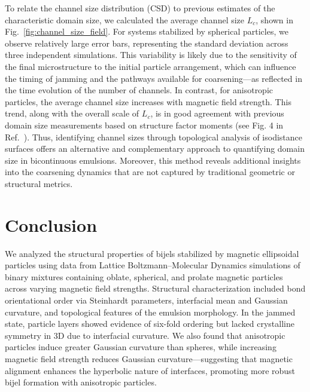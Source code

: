 To relate the channel size distribution (CSD) to previous estimates of the characteristic domain size, we calculated the average channel size \(L_c\), shown in Fig.~\ref{fig:channel_size_field}. For 
systems stabilized by spherical particles, we observe relatively large error bars, representing the standard deviation across three independent simulations. This variability is likely due to the 
sensitivity of the final microstructure to the initial particle arrangement, which can influence the timing of jamming and the pathways available for coarsening—as reflected in the time evolution of 
the number of channels. In contrast, for anisotropic particles, the average channel size increases with magnetic field strength. This trend, along with the overall scale of \(L_c\), is in good agreement 
with previous domain size measurements based on structure factor moments (see Fig. 4 in Ref.~). Thus, identifying channel sizes through topological analysis of 
isodistance surfaces offers an alternative and complementary approach to quantifying domain size in bicontinuous emulsions. Moreover, this method reveals additional insights into the coarsening dynamics 
that are not captured by traditional geometric or structural metrics.

\section{Conclusion}


We analyzed the structural properties of bijels stabilized by magnetic ellipsoidal particles using data from Lattice Boltzmann–Molecular Dynamics simulations of binary mixtures containing oblate, 
spherical, and prolate magnetic particles across varying magnetic field strengths. Structural characterization included bond orientational order via Steinhardt parameters, interfacial mean and 
Gaussian curvature, and topological features of the emulsion morphology. In the jammed state, particle layers showed evidence of six-fold ordering but lacked crystalline symmetry in 3D due to 
interfacial curvature. We also found that anisotropic particles induce greater Gaussian curvature than spheres, while increasing magnetic field strength reduces Gaussian curvature—suggesting that 
magnetic alignment enhances the hyperbolic nature of interfaces, promoting more robust bijel formation with anisotropic particles.

